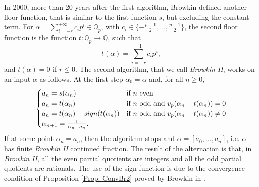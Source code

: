 \documentclass[12pt, reqno]{amsart}
\theoremstyle{plain}
\theoremstyle{definition}
\begin{document}
In 2000, more than 20 years after the first algorithm, Browkin \cite{BII} defined another floor function, that is similar to the first function $s$, but excluding the constant term. For $\alpha=\sum\limits_{i=-r}^{+\infty}c_ip^i\in\mathbb{Q}_p$, with $c_i \in \{ -\frac{p-1}{2}, \ldots, \frac{p-1}{2} \}$, the second floor function is the function $t:\mathbb{Q}_p\rightarrow \mathbb{Q}$, such that
\[t(\alpha)=\sum\limits_{i=-r}^{-1}c_ip^i,\]
and $t(\alpha)=0$ if $r\leq 0$. The second algorithm, that we call \textit{Browkin II}, works on an input $\alpha$ as follows. At the first step $\alpha_{0}=\alpha$ and, for all $n\geq 0$,
\begin{align} 
\begin{cases}\label{Alg: Br2}
a_n=s(\alpha_n) \ \ \ \ \ & \textup{if} \ n \ \textup{even}\\
a_n=t(\alpha_n) & \textup{if} \ n \ \textup{odd}\ \textup{and} \ v_p(\alpha_n-t(\alpha_n))= 0\\
a_n=t(\alpha_n)-sign(t(\alpha_n)) & \textup{if} \ n \ \textup{odd} \ \textup{and} \ v_p(\alpha_n-t(\alpha_n))\neq 0\\
\alpha_{n+1}=\frac{1}{\alpha_n-a_n}.
\end{cases}
\end{align}
If at some point $\alpha_n=a_n$, then the algorithm stops and $\alpha=[a_0,\ldots,a_n]$, i.e. $\alpha$ has finite \textit{Browkin II} continued fraction. The result of the alternation is that, in \textit{Browkin II}, all the even partial quotients are integers and all the odd partial quotients are rationals. The use of the sign function is due to the convergence condition of Proposition \ref{Prop: ConvBr2} proved by Browkin in \cite{BII}.
\end{document}
